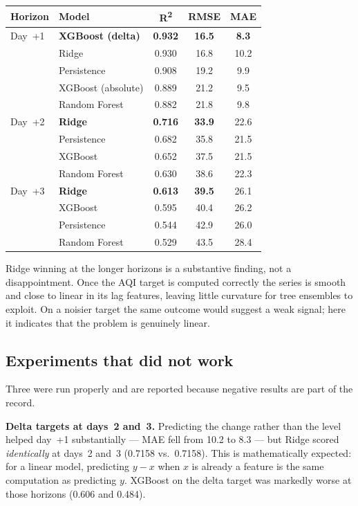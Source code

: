 \documentclass[11pt,a4paper]{article}
\begin{document}
\begin{center}
\small
\begin{tabular}{llccc}
\toprule
\textbf{Horizon} & \textbf{Model} & \textbf{R\textsuperscript{2}} & \textbf{RMSE} & \textbf{MAE} \\
\midrule
Day~+1 & \textbf{XGBoost (delta)} & \textbf{0.932} & \textbf{16.5} & \textbf{8.3} \\
       & Ridge                    & 0.930 & 16.8 & 10.2 \\
       & Persistence              & 0.908 & 19.2 & 9.9 \\
       & XGBoost (absolute)       & 0.889 & 21.2 & 9.5 \\
       & Random Forest            & 0.882 & 21.8 & 9.8 \\
\midrule
Day~+2 & \textbf{Ridge}           & \textbf{0.716} & \textbf{33.9} & 22.6 \\
       & Persistence              & 0.682 & 35.8 & 21.5 \\
       & XGBoost                  & 0.652 & 37.5 & 21.5 \\
       & Random Forest            & 0.630 & 38.6 & 22.3 \\
\midrule
Day~+3 & \textbf{Ridge}           & \textbf{0.613} & \textbf{39.5} & 26.1 \\
       & XGBoost                  & 0.595 & 40.4 & 26.2 \\
       & Persistence              & 0.544 & 42.9 & 26.0 \\
       & Random Forest            & 0.529 & 43.5 & 28.4 \\
\bottomrule
\end{tabular}
\end{center}

Ridge winning at the longer horizons is a substantive finding, not a
disappointment. Once the AQI target is computed correctly the series is
smooth and close to linear in its lag features, leaving little curvature
for tree ensembles to exploit. On a noisier target the same outcome
would suggest a weak signal; here it indicates that the problem is
genuinely linear.

\subsection{Experiments that did not work}

Three were run properly and are reported because negative results are
part of the record.

\textbf{Delta targets at days~2 and~3.} Predicting the change rather
than the level helped day~+1 substantially --- MAE fell from 10.2 to 8.3
--- but Ridge scored \emph{identically} at days~2 and~3
(0.7158 vs.\ 0.7158). This is mathematically expected: for a linear
model, predicting $y - x$ when $x$ is already a feature is the same
computation as predicting $y$. XGBoost on the delta target was markedly
worse at those horizons (0.606 and 0.484).
\end{document}
